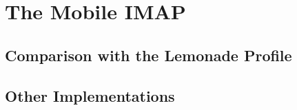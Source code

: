 \documentclass[trojita]{subfiles}
\begin{document}
\chapter{The Mobile IMAP}

\section{Comparison with the Lemonade Profile}
\label{sec:lemonade-comparison}

\section{Other Implementations}
\end{document}
